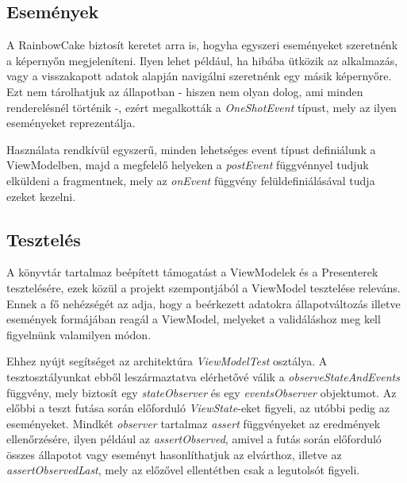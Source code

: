 \subsection{Események}
A RainbowCake biztosít keretet arra is, hogyha egyszeri eseményeket szeretnénk a képernyőn megjeleníteni. Ilyen lehet például, ha hibába ütközik az alkalmazás, vagy a visszakapott adatok alapján navigálni szeretnénk egy másik képernyőre. Ezt nem tárolhatjuk az állapotban - hiszen nem olyan dolog, ami minden renderelésnél történik -, ezért megalkották a \emph{OneShotEvent} típust, mely az ilyen eseményeket reprezentálja. \cite{Events}

Használata rendkívül egyszerű, minden lehetséges event típust definiálunk a ViewModelben, majd a megfelelő helyeken a \emph{postEvent} függvénnyel tudjuk elküldeni a fragmentnek, mely az \emph{onEvent} függvény felüldefiniálásával tudja ezeket kezelni. 

\subsection{Tesztelés}
A könyvtár tartalmaz beépített támogatást a ViewModelek és a Presenterek tesztelésére, ezek közül a projekt szempontjából a ViewModel tesztelése releváns. Ennek a fő nehézségét az adja, hogy a beérkezett adatokra állapotváltozás illetve események formájában reagál a ViewModel, melyeket a validáláshoz meg kell figyelnünk valamilyen módon. \cite{RainbowcakeTest}

Ehhez nyújt segítséget az architektúra \emph{ViewModelTest} osztálya. A tesztosztályunkat ebből leszármaztatva elérhetővé válik a \emph{observeStateAndEvents} függvény, mely biztosít egy \emph{stateObserver} és egy \emph{eventsObserver} objektumot. Az előbbi a teszt futása során előforduló \emph{ViewState}-eket figyeli, az utóbbi pedig az eseményeket. Mindkét \emph{observer} tartalmaz \emph{assert} függvényeket az eredmények ellenőrzésére, ilyen például az \emph{assertObserved}, amivel a futás során előforduló összes állapotot vagy eseményt hasonlíthatjuk az elvárthoz, illetve az \emph{assertObservedLast}, mely az előzővel ellentétben csak a legutolsót figyeli. 